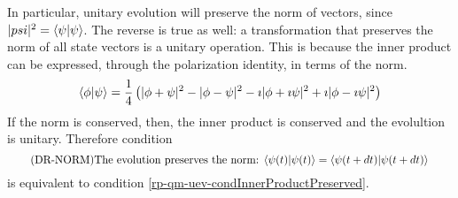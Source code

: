 In particular, unitary evolution will preserve the norm of vectors, since $|psi|^2 = \langle\psi | \psi \rangle$. The reverse is true as well: a transformation that preserves the norm of all state vectors is a unitary operation. This is because the inner product can be expressed, through the polarization identity, in terms of the norm.
\begin{equation}
	\begin{aligned}
		\langle \phi | \psi \rangle = \frac{1}{4}\left( |\phi + \psi|^2 - |\phi - \psi|^2 - \imath |\phi + \imath \psi|^2 +\imath |\phi - \imath \psi|^2 \right)
	\end{aligned}
\end{equation}
If the norm is conserved, then, the inner product is conserved and the evolultion is unitary. Therefore condition
\begin{equation}\label{rp-qm-uev-condNormalized}
	\tag{DR-NORM}
	\eqtext{The evolution preserves the norm: $\< \psi(t) | \psi(t) \> = \< \psi(t+dt) | \psi(t+dt) \>$} 
\end{equation}
is equivalent to condition \ref{rp-qm-uev-condInnerProductPreserved}.

